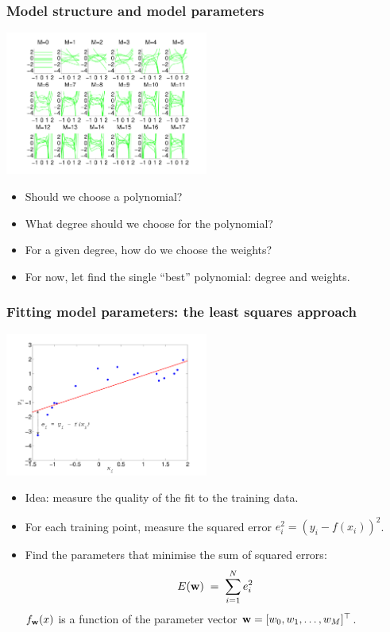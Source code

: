 \begin{frame}
\frametitle{Model structure and model parameters}

\centerline{\includegraphics[width=0.5\textwidth]{random_polynomials.pdf}}

\begin{itemize}
\item Should we choose a polynomial? \hfill{}
\item What degree should we choose for the polynomial? \hfill{}
\item For a given degree, how do we choose the weights? \hfill{}
\item For now, let find the single ``best'' polynomial: degree and weights.
\end{itemize}


\end{frame}
\begin{frame}
\frametitle{Fitting model parameters: the least squares approach}

\centerline{\includegraphics[width=0.5\textwidth]{toy_data_example_fit.pdf}}

\begin{itemize}
\item Idea: measure the quality of the fit to the training data.
\item For each training point, measure the squared error $e_i^2=(y_i-f(x_i))^2$.
\item Find the parameters that minimise the sum of squared errors:
%
\[
E(\mathbf w)\;=\;\sum_{i=1}^N e_i^2
\]
%
$f_\mathbf w(x)$ is a function of the parameter vector 
$\mathbf w=[w_0, w_1, \ldots, w_M]{\scriptsize^{\top}}$.
\end{itemize}


\end{frame}
